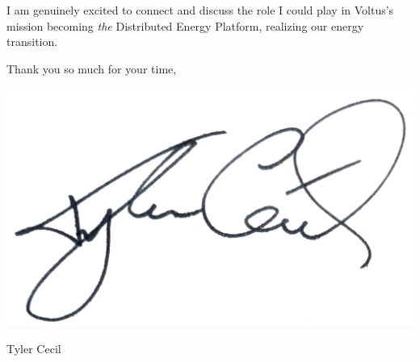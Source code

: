 \documentclass{tc_cv}
\begin{document}
\begin{adjustwidth}{40pt}{40pt}
  I am genuinely excited to connect and
  discuss the role I could play in Voltus's mission becoming \emph{the}
  Distributed Energy Platform, realizing our energy transition.

  \begin{minipage}{0.5\linewidth}
    Thank you so much for your time,
    \vspace{1em}
  \end{minipage}
  \begin{minipage}{0.5\linewidth}
    \hfill\includegraphics[height=4.5\baselineskip]{sig}

    \vspace{-2em}
    \hfill Tyler Cecil
  \end{minipage}

\end{adjustwidth}
\end{document}
